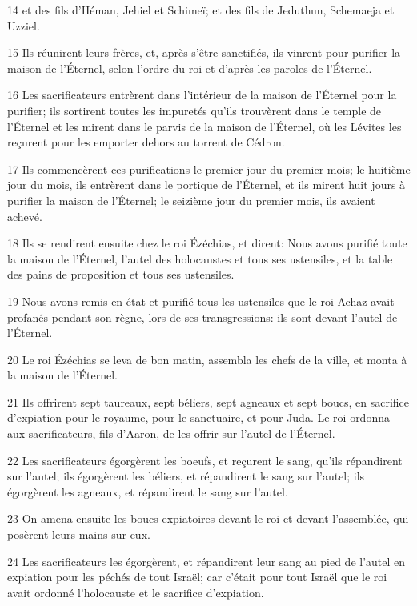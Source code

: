 \par 14 et des fils d'Héman, Jehiel et Schimeï; et des fils de Jeduthun, Schemaeja et Uzziel.
\par 15 Ils réunirent leurs frères, et, après s'être sanctifiés, ils vinrent pour purifier la maison de l'Éternel, selon l'ordre du roi et d'après les paroles de l'Éternel.
\par 16 Les sacrificateurs entrèrent dans l'intérieur de la maison de l'Éternel pour la purifier; ils sortirent toutes les impuretés qu'ils trouvèrent dans le temple de l'Éternel et les mirent dans le parvis de la maison de l'Éternel, où les Lévites les reçurent pour les emporter dehors au torrent de Cédron.
\par 17 Ils commencèrent ces purifications le premier jour du premier mois; le huitième jour du mois, ils entrèrent dans le portique de l'Éternel, et ils mirent huit jours à purifier la maison de l'Éternel; le seizième jour du premier mois, ils avaient achevé.
\par 18 Ils se rendirent ensuite chez le roi Ézéchias, et dirent: Nous avons purifié toute la maison de l'Éternel, l'autel des holocaustes et tous ses ustensiles, et la table des pains de proposition et tous ses ustensiles.
\par 19 Nous avons remis en état et purifié tous les ustensiles que le roi Achaz avait profanés pendant son règne, lors de ses transgressions: ils sont devant l'autel de l'Éternel.
\par 20 Le roi Ézéchias se leva de bon matin, assembla les chefs de la ville, et monta à la maison de l'Éternel.
\par 21 Ils offrirent sept taureaux, sept béliers, sept agneaux et sept boucs, en sacrifice d'expiation pour le royaume, pour le sanctuaire, et pour Juda. Le roi ordonna aux sacrificateurs, fils d'Aaron, de les offrir sur l'autel de l'Éternel.
\par 22 Les sacrificateurs égorgèrent les boeufs, et reçurent le sang, qu'ils répandirent sur l'autel; ils égorgèrent les béliers, et répandirent le sang sur l'autel; ils égorgèrent les agneaux, et répandirent le sang sur l'autel.
\par 23 On amena ensuite les boucs expiatoires devant le roi et devant l'assemblée, qui posèrent leurs mains sur eux.
\par 24 Les sacrificateurs les égorgèrent, et répandirent leur sang au pied de l'autel en expiation pour les péchés de tout Israël; car c'était pour tout Israël que le roi avait ordonné l'holocauste et le sacrifice d'expiation.
